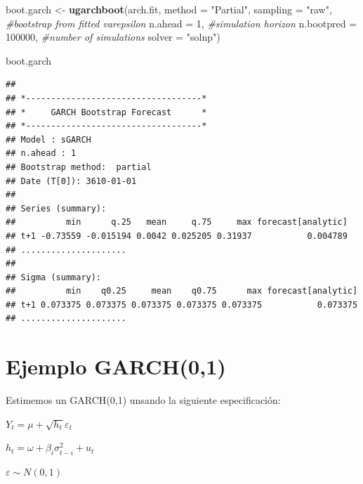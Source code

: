 \documentclass[
]{book}
\newenvironment{Shaded}{\begin{snugshade}}{\end{snugshade}}
\newcommand{\AttributeTok}[1]{\textcolor[rgb]{0.13,0.29,0.53}{#1}}
\newcommand{\CommentTok}[1]{\textcolor[rgb]{0.56,0.35,0.01}{\textit{#1}}}
\newcommand{\DecValTok}[1]{\textcolor[rgb]{0.00,0.00,0.81}{#1}}
\newcommand{\FunctionTok}[1]{\textcolor[rgb]{0.13,0.29,0.53}{\textbf{#1}}}
\newcommand{\NormalTok}[1]{#1}
\newcommand{\OtherTok}[1]{\textcolor[rgb]{0.56,0.35,0.01}{#1}}
\newcommand{\StringTok}[1]{\textcolor[rgb]{0.31,0.60,0.02}{#1}}
\begin{document}
\begin{Shaded}
\begin{Highlighting}[]
\NormalTok{boot.garch }\OtherTok{\textless{}{-}} \FunctionTok{ugarchboot}\NormalTok{(arch.fit,}
                         \AttributeTok{method =} \StringTok{"Partial"}\NormalTok{,}
                         \AttributeTok{sampling =} \StringTok{"raw"}\NormalTok{,  }\CommentTok{\#bootstrap from fitted varepsilon}
                         \AttributeTok{n.ahead =} \DecValTok{1}\NormalTok{,          }\CommentTok{\#simulation horizon}
                         \AttributeTok{n.bootpred =} \DecValTok{100000}\NormalTok{, }\CommentTok{\#number of simulations }
                         \AttributeTok{solver =} \StringTok{"solnp"}\NormalTok{)}

\NormalTok{boot.garch}
\end{Highlighting}
\end{Shaded}

\begin{verbatim}
## 
## *-----------------------------------*
## *     GARCH Bootstrap Forecast      *
## *-----------------------------------*
## Model : sGARCH
## n.ahead : 1
## Bootstrap method:  partial
## Date (T[0]): 3610-01-01
## 
## Series (summary):
##          min      q.25   mean     q.75     max forecast[analytic]
## t+1 -0.73559 -0.015194 0.0042 0.025205 0.31937           0.004789
## .....................
## 
## Sigma (summary):
##          min    q0.25     mean    q0.75      max forecast[analytic]
## t+1 0.073375 0.073375 0.073375 0.073375 0.073375           0.073375
## .....................
\end{verbatim}

\hypertarget{ejemplo-garch01}{%
\section{Ejemplo GARCH(0,1)}\label{ejemplo-garch01}}

Estimemos un GARCH(0,1) unsando la siguiente especificación:

\(Y_t = \mu+\sqrt{h_t}\varepsilon_t\)

\(h_t = \omega+\beta_i \sigma^2_{t-i}+u_t\)

\(\varepsilon \sim N(0,1)\)
\end{document}
